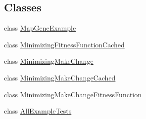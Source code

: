 \subsection*{Classes}
\begin{DoxyCompactItemize}
\item 
class \hyperlink{classexamples_1_1_map_gene_example}{Map\-Gene\-Example}
\item 
class \hyperlink{classexamples_1_1_minimizing_fitness_function_cached}{Minimizing\-Fitness\-Function\-Cached}
\item 
class \hyperlink{classexamples_1_1_minimizing_make_change}{Minimizing\-Make\-Change}
\item 
class \hyperlink{classexamples_1_1_minimizing_make_change_cached}{Minimizing\-Make\-Change\-Cached}
\item 
class \hyperlink{classexamples_1_1_minimizing_make_change_fitness_function}{Minimizing\-Make\-Change\-Fitness\-Function}
\item 
class \hyperlink{classexamples_1_1_all_example_tests}{All\-Example\-Tests}
\end{DoxyCompactItemize}
